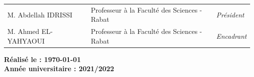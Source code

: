 \documentclass[11pt,french]{report}
\begin{document}
\begin{titlepage}
\begin{center}
\begin{tabular}{lll}

\Large{M. Abdellah IDRISSI}  &  \Large{Professeur à la Faculté des Sciences  - Rabat} & \Large{\textit{Président}}	\\[0.1cm]
\Large{M. Ahmed EL-YAHYAOUI}   &  \Large{Professeur à la Faculté des Sciences - Rabat} & \Large{\textit{Encadrant}}	\\

\end{tabular}



\vspace*{1cm}
\linespread{1.3}\huge {\bfseries Réalisé le : \today}\\[0,3cm]
\textbf{\large{Année universitaire : 2021/2022}}

\end{center}

\end{titlepage}








\newpage
\tableofcontents

\newpage
\listoffigures


\end{document}
